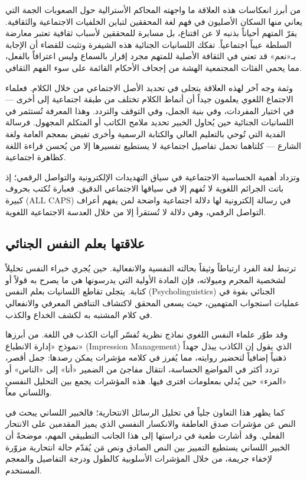 من أبرز انعكاسات هذه العلاقة ما واجهته المحاكم الأسترالية حول الصعوبات الجمة التي يعاني منها السكان الأصليون في فهم لغة المحققين لتباين الخلفيات الاجتماعية والثقافية\autocite[92]{alabadi2020}. يقرّ المتهم أحياناً بذنبه لا عن اقتناع، بل مسايرة للمحققين لأسباب ثقافية تعتبر معارضة السلطة عيباً اجتماعياً. تفكك اللسانيات الجنائية هذه الشيفرة وتثبت للقضاء أن الإجابة بـ«نعم» قد تعني في الثقافة الأصلية للمتهم مجرد إقرار بالسماع وليس اعترافاً بالفعل، مما يحمي الفئات المجتمعية الهشة من إجحاف الأحكام القائمة على سوء الفهم الثقافي.

وثمة وجه آخر لهذه العلاقة يتجلى في تحديد الأصل الاجتماعي من خلال الكلام. فعلماء الاجتماع اللغوي يعلمون جيداً أن أنماط الكلام تختلف من طبقة اجتماعية إلى أخرى — في اختيار المفردات، وفي بنية الجمل، وفي التوقف والتردد. وهذا المعرفة تُستثمر في اللسانيات الجنائية حين يُحاول الخبير تحديد ملامح الكاتب أو المتكلم المجهول. فرسالة الفدية التي تُوحي بالتعليم العالي والكتابة الرسمية وأخرى تفيض بمعجم العامة ولغة الشارع — كلتاهما تحمل تفاصيل اجتماعية لا يستطيع تفسيرها إلا من يُحسن قراءة اللغة كظاهرة اجتماعية.

وتزداد أهمية الحساسية الاجتماعية في سياق التهديدات الإلكترونية والتواصل الرقمي؛ إذ باتت الجرائم اللغوية لا تُفهم إلا في سياقها الاجتماعي الدقيق. فعبارة تُكتب بحروف كبيرة (\textenglish{ALL CAPS}) في رسالة إلكترونية لها دلالة اجتماعية واضحة لمن يفهم أعراف التواصل الرقمي، وهي دلالة لا تُستقرأ إلا من خلال العدسة الاجتماعية اللغوية.

\subsection{علاقتها بعلم النفس الجنائي}

ترتبط لغة الفرد ارتباطاً وثيقاً بحالته النفسية والانفعالية. حين يُجري خبراء النفس تحليلاً لشخصية المجرم وميولاته، فإن المادة الأولية التي يدرسونها هي ما يصرح به قولاً أو كتابة. يتجلى تقاطع اللسانيات بعلم النفس (\textenglish{Psycholinguistics}) الجنائي بقوة في عمليات استجواب المتهمين، حيث يسعى المحقق لاكتشاف التناقض المعرفي والانفعالي في كلام المشتبه به لكشف الخداع والكذب.

وقد طوّر علماء النفس اللغوي نماذج نظرية تُفسّر آليات الكذب في اللغة. من أبرزها نموذج «إدارة الانطباع» (\textenglish{Impression Management}) الذي يقول إن الكاذب يبذل جهداً ذهنياً إضافياً لتحضير روايته، مما يُفرز في كلامه مؤشرات يمكن رصدها: جمل أقصر، تردد أكثر في المواضع الحساسة، انتقال مفاجئ من الضمير «أنا» إلى «الناس» أو «المرء» حين يُدلي بمعلومات افترى فيها. هذه المؤشرات يجمع بين التحليل النفسي واللساني معاً.

كما يظهر هذا التعاون جلياً في تحليل الرسائل الانتحارية؛ فالخبير اللساني يبحث في النص عن مؤشرات صدق العاطفة والانكسار النفسي الذي يميز المقدمين على الانتحار الفعلي. وقد أشارت طعبة في دراستها إلى هذا الجانب التطبيقي المهم، موضحةً أن الخبير اللساني يستطيع التمييز بين النص الصادق ونص مَن يُقدّم حالة انتحارية مزوّرة لإخفاء جريمة، من خلال المؤشرات الأسلوبية كالطول ودرجة التفاصيل والمعجم المستخدم\autocite[56]{taaba2022}.

